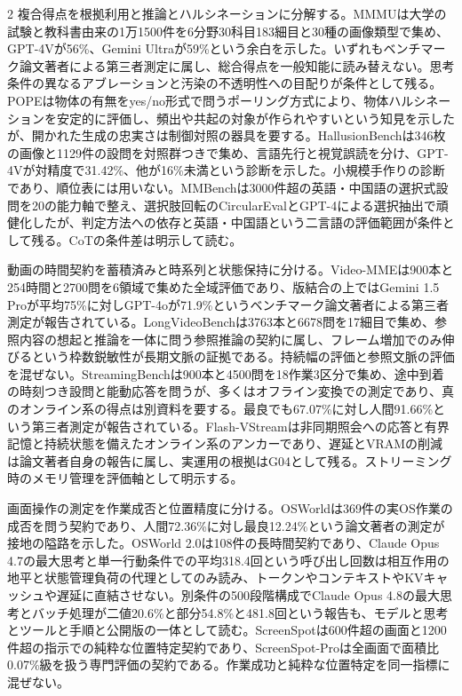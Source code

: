\documentclass[lualatex,a4paper,10pt]{jlreq}
\begin{document}
\begin{multicols}{2}
\noindent 複合得点を根拠利用と推論とハルシネーションに分解する。MMMUは大学の試験と教科書由来の1万1500件を6分野30科目183細目と30種の画像類型で集め、GPT-4Vが56\%、Gemini Ultraが59\%という余白を示した。いずれもベンチマーク論文著者による第三者測定に属し、総合得点を一般知能に読み替えない。思考条件の異なるアブレーションと汚染の不透明性への目配りが条件として残る。POPEは物体の有無をyes/no形式で問うポーリング方式により、物体ハルシネーションを安定的に評価し、頻出や共起の対象が作られやすいという知見を示したが、開かれた生成の忠実さは制御対照の器具を要する。HallusionBenchは346枚の画像と1129件の設問を対照群つきで集め、言語先行と視覚誤読を分け、GPT-4Vが対精度で31.42\%、他が16\%未満という診断を示した。小規模手作りの診断であり、順位表には用いない。MMBenchは3000件超の英語・中国語の選択式設問を20の能力軸で整え、選択肢回転のCircularEvalとGPT-4による選択抽出で頑健化したが、判定方法への依存と英語・中国語という二言語の評価範囲が条件として残る。CoTの条件差は明示して読む。\autocite{vmd078,vmd079,vmd080,vmd081}\par\medskip
\noindent 動画の時間契約を蓄積済みと時系列と状態保持に分ける。Video-MMEは900本と254時間と2700問を6領域で集めた全域評価であり、版結合の上ではGemini 1.5 Proが平均75\%に対しGPT-4oが71.9\%というベンチマーク論文著者による第三者測定が報告されている。LongVideoBenchは3763本と6678問を17細目で集め、参照内容の想起と推論を一体に問う参照推論の契約に属し、フレーム増加でのみ伸びるという枠数鋭敏性が長期文脈の証拠である。持続幅の評価と参照文脈の評価を混ぜない。StreamingBenchは900本と4500問を18作業3区分で集め、途中到着の時刻つき設問と能動応答を問うが、多くはオフライン変換での測定であり、真のオンライン系の得点は別資料を要する。最良でも67.07\%に対し人間91.66\%という第三者測定が報告されている。Flash-VStreamは非同期照会への応答と有界記憶と持続状態を備えたオンライン系のアンカーであり、遅延とVRAMの削減は論文著者自身の報告に属し、実運用の根拠はG04として残る。ストリーミング時のメモリ管理を評価軸として明示する。\autocite{vmd086,vmd087,vmd088,vmd089}\par\medskip
\noindent 画面操作の測定を作業成否と位置精度に分ける。OSWorldは369件の実OS作業の成否を問う契約であり、人間72.36\%に対し最良12.24\%という論文著者の測定が接地の隘路を示した。OSWorld 2.0は108件の長時間契約であり、Claude Opus 4.7の最大思考と単一行動条件での平均318.4回という呼び出し回数は相互作用の地平と状態管理負荷の代理としてのみ読み、トークンやコンテキストやKVキャッシュや遅延に直結させない。別条件の500段階構成でClaude Opus 4.8の最大思考とバッチ処理が二値20.6\%と部分54.8\%と481.8回という報告も、モデルと思考とツールと手順と公開版の一体として読む。ScreenSpotは600件超の画面と1200件超の指示での純粋な位置特定契約であり、ScreenSpot-Proは全画面で面積比0.07\%級を扱う専門評価の契約である。作業成功と純粋な位置特定を同一指標に混ぜない。\autocite{vmd090,vmd091,vmd092,vmd120}\par\medskip

\end{multicols}
\end{document}
